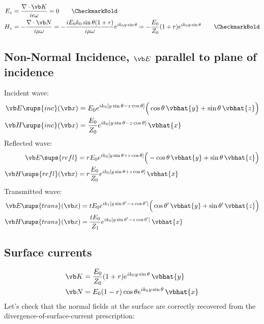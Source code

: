 \documentclass{article}
\begin{document}
\begin{align*}
  E_z &= \frac{\nabla \cdot \vb K}{i\epsilon\omega} = 0
\qquad \text{\CheckmarkBold}
\\
  H_z & = -\frac{\nabla \cdot \vb N}{i\mu\omega} 
        = -\frac{i E_0 k_0 \sin\theta(1+r)}{i\mu\omega} e^{ik_0 y\sin\theta}
        = -\frac{E_0}{Z_0}(1+r) e^{ik_0 y \sin\theta} 
\qquad \text{\CheckmarkBold}
\end{align*}

\subsection{Non-Normal Incidence, $\vb E$ parallel to plane of incidence}

%
Incident wave:
%
\begin{align*}
\vb E\sups{inc}(\vb x) 
 &= E_0 
    e^{ik_0[y\sin\theta  - z\cos\theta ]} 
    \Big( \cos\theta\,\vbhat{y} + \sin\theta\,\vbhat{z}\Big)
\\
\vb H\sups{inc}(\vb x) 
 &= \frac{E_0}{Z_0} 
    e^{ik_0[y\sin\theta -z \cos\theta]} \,\vbhat{x}
\end{align*}
%
Reflected wave:
%
\begin{align*}
\vb E\sups{refl} 
 &= rE_0 e^{ik_0[y\sin\theta + z\cos\theta ]} 
    \Big( -\cos\theta\,\vbhat{y} + \sin\theta\,\vbhat{z}\Big)
\\
\vb H\sups{refl}(\vb x) 
 &=  r \frac{E_0}{Z_0} 
       e^{ik_0[y\sin\theta +z \cos\theta]} \,\vbhat{x}
\end{align*}
%
Transmitted wave:
%
\begin{align*}
\vb E\sups{trans}(\vb x) 
 &= tE_0 e^{ik_1[y\sin\theta^\prime - z\cos\theta^\prime ]} 
    \Big( \cos\theta^\prime\,\vbhat{y} + \sin\theta^\prime\,\vbhat{z}\Big)
\\
\vb H\sups{trans}(\vb x) 
 &= \frac{tE_0}{Z_1} 
    e^{ik_0[y\sin\theta^\prime -z \cos\theta^\prime]} \,\vbhat{x}
\end{align*}

\subsection*{Surface currents}

\begin{align*}
  \vb K &= \frac{E_0}{Z_0} (1+r) e^{ik_0 y \sin \theta} \, \vbhat{y} 
\\
  \vb N &= E_0 (1-r) \cos\theta e^{ik_0 y \sin \theta} \, \vbhat{x} 
\end{align*}
%
Let's check that the normal fields at the surface are 
correctly recovered from the divergence-of-surface-current 
prescription:
\end{document}
